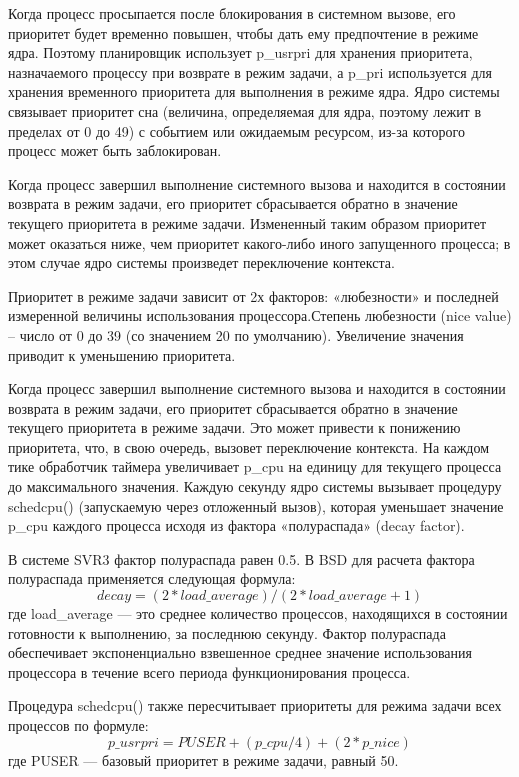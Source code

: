 Когда процесс просыпается после блокирования в системном вызове, его приоритет будет временно повышен, чтобы дать ему предпочтение в режиме ядра. Поэтому планировщик использует p\_usrpri для хранения приоритета, назначаемого процессу при возврате в режим задачи, а p\_pri используется для хранения временного приоритета для выполнения в режиме ядра. Ядро системы связывает приоритет сна (величина, определяемая для ядра, поэтому лежит в пределах от 0 до 49) с событием или ожидаемым ресурсом, из-за которого процесс может быть заблокирован.

Когда процесс завершил выполнение системного вызова и находится в состоянии возврата в режим задачи, его приоритет сбрасывается обратно в значение текущего приоритета в режиме задачи. Измененный таким образом приоритет может оказаться ниже, чем приоритет какого-либо иного запущенного процесса; в этом случае ядро системы произведет переключение контекста.

Приоритет в режиме задачи зависит от 2х факторов: «любезности» и последней измеренной величины использования процессора.Степень любезности (nice value) – число от 0 до 39 (со значением 20 по умолчанию). Увеличение значения приводит к уменьшению приоритета.

Когда процесс завершил выполнение системного вызова и находится в состоянии возврата в режим задачи, его приоритет сбрасывается обратно в значение текущего приоритета в режиме задачи. Это может привести к понижению приоритета, что, в свою очередь, вызовет переключение контекста.
На каждом тике обработчик таймера увеличивает p\_cpu на единицу для текущего процесса до максимального значения.
Каждую секунду ядро системы вызывает процедуру schedcpu() (запускаемую через отложенный вызов), которая уменьшает значение p\_cpu каждого процесса исходя из фактора «полураспада» (decay factor).

В системе SVR3 фактор полураспада равен 0.5.
В BSD для расчета фактора полураспада применяется следующая формула:
\begin{equation}
decay = (2 * load\_average) / (2 * load\_average + 1)
\end{equation}
где load\_average — это среднее количество процессов, находящихся в состоянии готовности к выполнению, за последнюю секунду. Фактор полураспада обеспечивает экспоненциально взвешенное среднее значение использования процессора в течение всего периода функционирования процесса.

Процедура schedcpu() также пересчитывает приоритеты для режима задачи всех процессов по формуле:
\begin{equation}
p\_usrpri = PUSER + (p\_cpu/4) + (2*p\_nice)
\end{equation}
где PUSER — базовый приоритет в режиме задачи, равный 50.

